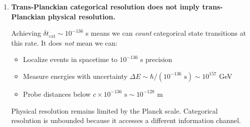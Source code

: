 \documentclass[twocolumn,10pt]{article}
\theoremstyle{remark}
\begin{document}
\begin{enumerate}
    Both measure rotation rate, but the categorical method scales indefinitely by increasing marking density, without increasing photon energy.

    \item \textbf{Trans-Planckian categorical resolution does not imply trans-Planckian physical resolution.}

    Achieving $\delta t_{\text{cat}} \sim 10^{-136}$ s means we can \textit{count} categorical state transitions at this rate. It does \textit{not} mean we can:
    \begin{itemize}
        \item Localize events in spacetime to $10^{-136}$ s precision
        \item Measure energies with uncertainty $\Delta E \sim \hbar/(10^{-136} \text{ s}) \sim 10^{157}$ GeV
        \item Probe distances below $c \times 10^{-136} \text{ s} \sim 10^{-128}$ m
    \end{itemize}

    Physical resolution remains limited by the Planck scale. Categorical resolution is unbounded because it accesses a different information channel.
\end{enumerate}
\end{document}
